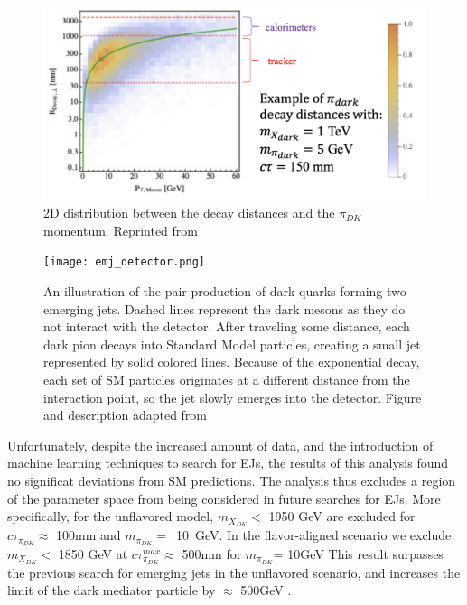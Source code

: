 \begin{figure}
	\centering
	\includegraphics[width=.75\linewidth]{Images/Decay-distances-emj.png}
	\caption[2D distributions of decay distances and $\pi_{DK}$ momentum]{2D distribution between the decay distances and the $\pi_{DK}$ momentum. Reprinted from \cite{Schwaller:2015gea}}
	\label{fig:decay-distance}
\end{figure}



\begin{figure}
	\centering
	\texttt{[image: emj\_detector.png]}
	\caption[Illustration of the emerging jets forming in a detector]{An illustration of the pair production of dark quarks forming two emerging jets. Dashed lines represent the dark mesons as they do not interact with the detector. After traveling some distance, each dark pion decays into Standard Model particles, creating a small jet represented by solid colored lines. Because of the exponential decay, each set of SM particles originates at a different distance from the interaction point, so the jet slowly emerges into the detector. Figure and description adapted from \cite{Schwaller:2015gea}}
	\label{fig:2emj_inCMS}
\end{figure}

Unfortunately, despite the increased amount of data, and the introduction of machine learning techniques to search for EJs, the results of this analysis found no significat deviations from SM predictions. The analysis thus excludes a region of the parameter space from being considered in future searches for EJs. More specifically, for the unflavored model, $m_{X_{DK}} <$  1950 GeV are excluded for $c\tau_{\pi_{DK}} \approx$ 100mm and $m_{\pi_{DK}}=$~10~GeV. In the flavor-aligned scenario we exclude $m_{X_{DK}} <$  1850 GeV at $c\tau^{max}_{\pi_{DK}} \approx$ 500mm for $m_{\pi_{DK}}$= 10GeV
This result surpasses the previous search for emerging jets in the unflavored scenario, and increases the limit of the dark mediator particle by $\approx$ 500GeV  \cite{CMS:2024gxp}.


